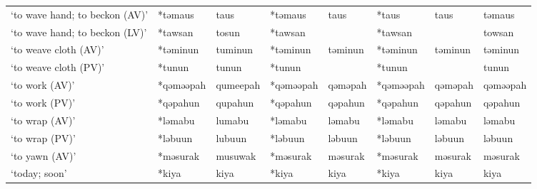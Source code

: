 \begin{landscape}
\begin{longtable}[c]{@{}p{3cm}<{\raggedright}p{2.75cm}<{\raggedright}p{2.75cm}<{\raggedright}p{2.75cm}<{\raggedright}p{2.75cm}<{\raggedright}p{2.75cm}<{\raggedright}p{2.75cm}<{\raggedright}p{2.75cm}<{\raggedright}@{}}
`to wave hand; to beckon (AV)'                       & *təmaus            & taus                           & *təmaus            & taus                       & *taus            & taus                     & təmaus                            \\
`to wave hand; to beckon (LV)'                       & *tawsan            & tosun                          & *tawsan            &                            & *tawsan          &                          & towsan                            \\
`to weave cloth (AV)'                                & *təminun           & tuminun                        & *təminun           & təminun                    & *təminun         & təminun                  & təminun                           \\
`to weave cloth (PV)'                                & *tunun             & tunun                          & *tunun             &                            & *tunun           &                          & tunun                             \\
`to work (AV)'                                       & *qəməəpah          & qumeepah                       & *qəməəpah          & qəməpah                    & *qəməəpah        & qəməpah                  & qəməəpah                          \\
`to work (PV)'                                       & *qəpahun           & qupahun                        & *qəpahun           & qəpahun                    & *qəpahun         & qəpahun                  & qəpahun                           \\
`to wrap (AV)'                                       & *ləmabu            & lumabu                         & *ləmabu            & ləmabu                     & *ləmabu          & ləmabu                   & ləmabu                            \\
`to wrap (PV)'                                       & *ləbuun            & lubuun                         & *ləbuun            & ləbuun                     & *ləbuun          & ləbuun                   & ləbuun                            \\
`to yawn (AV)'                                       & *məsurak           & musuwak                        & *məsurak           & məsurak                    & *məsurak         & məsurak                  & məsurak                           \\
`today; soon'                                        & *kiya              & kiya                           & *kiya              & kiya                       & *kiya            & kiya                     & kiya                              \\

\end{longtable}
\end{landscape}
